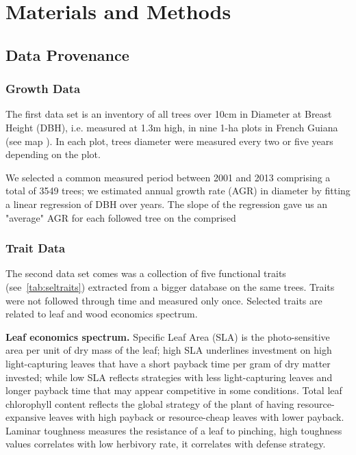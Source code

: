 \section*{Materials and Methods}
\label{sec:M&M}

\subsection*{Data Provenance}

\subsubsection*{Growth Data}
The first data set is an inventory of all trees over 10cm in Diameter at Breast Height (DBH), i.e. measured at 1.3m high, in nine 1-ha plots in French Guiana (see map \missfig). In each plot, trees diameter were measured every two or five years depending on the plot.

We selected a common measured period between 2001 and 2013 comprising a total of 3549 trees; we estimated annual growth rate (AGR) in diameter by fitting a linear regression of DBH over years. The slope of the regression gave us an "average" AGR for each followed tree on the comprised 


\subsubsection*{Trait Data}

The second data set comes was a collection of five functional traits (see~\autoref{tab:seltraits}) extracted from a bigger database \citep{baraloto_decoupled_2010} on the same trees. Traits were not followed through time and measured only once. Selected traits are related to leaf and wood economics spectrum\citep{westoby_leaf-height-seed_1998, baraloto_decoupled_2010}.

\textbf{Leaf economics spectrum.} Specific Leaf Area (SLA) is the photo-sensitive area per unit of dry mass of the leaf; high SLA underlines investment on high light-capturing leaves that have a short payback time per gram of dry matter invested; while low SLA reflects strategies with less light-capturing leaves and longer payback time that may appear competitive in some conditions. Total leaf chlorophyll content reflects the global strategy of the plant of having resource-expansive leaves with high payback or resource-cheap leaves with lower payback. Laminar toughness measures the resistance of a leaf to pinching, high toughness values correlates with low herbivory rate, it correlates with defense strategy.

